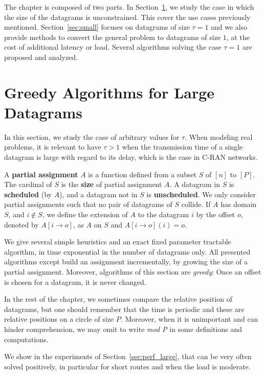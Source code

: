 The chapter is composed of two parts. In Section~\ref{sec:large}, we study the case in which the size of the datagrams is unconstrained. This cover the use cases previously mentioned. Section~\ref{sec:small} focuses on datagrams of size $\tau = 1$ and we also provide methods to convert the general problem to datagrams of size $1$, at the cost of additional latency or load. Several algorithms solving the case $\tau = 1$ are proposed and analyzed.

\section{Greedy Algorithms for Large Datagrams} \label{sec:large}

In this section, we study the case of arbitrary values for $\tau$. When modeling real problems,
it is relevant to have $\tau > 1$ when the transmission time of a single datagram is large with regard to its delay,
which is the case in C-RAN networks.

A \textbf{partial assignment} $A$ is a function defined from a subset $S$ of $[n]$ to $[P]$.
The cardinal of $S$ is the \textbf{size} of partial assignment $A$. A datagram in $S$ is \textbf{scheduled} (by $A$), and a datagram not in $S$ is \textbf{unscheduled}. We only consider partial assignments such that no pair of datagrams of $S$ collide. If $A$ has domain $S$, and $i \notin S$, we define the extension of $A$ to the datagram $i$ by the offset $o$, denoted by $A[i \rightarrow o]$, as $A$ on $S$ and $A[i \rightarrow o](i) = o$.

  We give several simple heuristics and an exact fixed parameter tractable algorithm, in time exponential in the number of datagrams only. All presented algorithms except \exactresolution build an assignment incrementally, by growing the size of a partial assignment. Moreover, algorithms of this section are \emph{greedy}: Once an offset is chosen for a datagram, it is never changed. 

In the rest of the chapter, we sometimes compare the relative position of datagrams, but one should remember that the
time is periodic and these are relative positions on a circle of size $P$. Moreover, when it is unimportant and can hinder comprehension, we may omit to write \emph{mod P} in some definitions and computations.

We show in the experiments of Section~\ref{sec:perf_large}, that \pazl can be very often solved positively, in particular for short routes and when the load is moderate.



